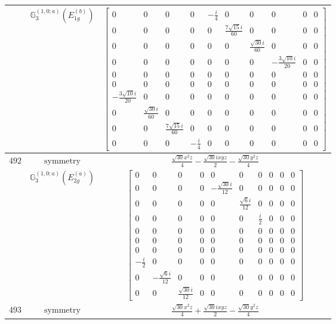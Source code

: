 \documentclass[fleqn,8pt,landscape]{jsarticle}
\begin{document}
\begin{longtable}{ccc}
$  $ & $ \mathbb{G}_{3}^{(1,0;a)}(E_{1g}^{(b)}) $ & $ \begin{bmatrix} 0 & 0 & 0 & 0 & - \frac{i}{4} & 0 & 0 & 0 & 0 & 0 \\ 0 & 0 & 0 & 0 & 0 & \frac{7 \sqrt{15} i}{60} & 0 & 0 & 0 & 0 \\ 0 & 0 & 0 & 0 & 0 & 0 & \frac{\sqrt{30} i}{60} & 0 & 0 & 0 \\ 0 & 0 & 0 & 0 & 0 & 0 & 0 & - \frac{3 \sqrt{10} i}{20} & 0 & 0 \\ 0 & 0 & 0 & 0 & 0 & 0 & 0 & 0 & 0 & 0 \\ 0 & 0 & 0 & 0 & 0 & 0 & 0 & 0 & 0 & 0 \\ - \frac{3 \sqrt{10} i}{20} & 0 & 0 & 0 & 0 & 0 & 0 & 0 & 0 & 0 \\ 0 & \frac{\sqrt{30} i}{60} & 0 & 0 & 0 & 0 & 0 & 0 & 0 & 0 \\ 0 & 0 & \frac{7 \sqrt{15} i}{60} & 0 & 0 & 0 & 0 & 0 & 0 & 0 \\ 0 & 0 & 0 & - \frac{i}{4} & 0 & 0 & 0 & 0 & 0 & 0 \end{bmatrix} $ \\ \hline
$ 492 $ & $ \text{symmetry} $ & $ \frac{\sqrt{30} x^{2} z}{4} - \frac{\sqrt{30} i x y z}{2} - \frac{\sqrt{30} y^{2} z}{4} $ \\
$  $ & $ \mathbb{G}_{3}^{(1,0;a)}(E_{2g}^{(a)}) $ & $ \begin{bmatrix} 0 & 0 & 0 & 0 & 0 & 0 & 0 & 0 & 0 & 0 \\ 0 & 0 & 0 & 0 & - \frac{\sqrt{30} i}{12} & 0 & 0 & 0 & 0 & 0 \\ 0 & 0 & 0 & 0 & 0 & \frac{\sqrt{6} i}{12} & 0 & 0 & 0 & 0 \\ 0 & 0 & 0 & 0 & 0 & 0 & \frac{i}{2} & 0 & 0 & 0 \\ 0 & 0 & 0 & 0 & 0 & 0 & 0 & 0 & 0 & 0 \\ 0 & 0 & 0 & 0 & 0 & 0 & 0 & 0 & 0 & 0 \\ 0 & 0 & 0 & 0 & 0 & 0 & 0 & 0 & 0 & 0 \\ - \frac{i}{2} & 0 & 0 & 0 & 0 & 0 & 0 & 0 & 0 & 0 \\ 0 & - \frac{\sqrt{6} i}{12} & 0 & 0 & 0 & 0 & 0 & 0 & 0 & 0 \\ 0 & 0 & \frac{\sqrt{30} i}{12} & 0 & 0 & 0 & 0 & 0 & 0 & 0 \end{bmatrix} $ \\ \hline
$ 493 $ & $ \text{symmetry} $ & $ \frac{\sqrt{30} x^{2} z}{4} + \frac{\sqrt{30} i x y z}{2} - \frac{\sqrt{30} y^{2} z}{4} $ \\

\end{longtable}
\end{document}
